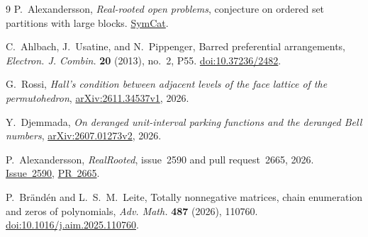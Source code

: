 \documentclass[11pt]{article}
\begin{document}
\begin{thebibliography}{9}
\setlength{\itemsep}{2pt}
P.~Alexandersson, \emph{Real-rooted open problems}, conjecture on ordered set partitions with large blocks.
\href{https://www.symmetricfunctions.com/realRootedOpenProblems.htm\#set-partitions-and-trees}{SymCat}.

C.~Ahlbach, J.~Usatine, and N.~Pippenger, Barred preferential arrangements,
\emph{Electron. J. Combin.} \textbf{20} (2013), no.~2, P55.
\href{https://doi.org/10.37236/2482}{doi:10.37236/2482}.

G.~Rossi, \emph{Hall's condition between adjacent levels of the face lattice of the permutohedron},
\href{https://arxiv.org/abs/2611.34537v1}{arXiv:2611.34537v1}, 2026.

Y.~Djemmada, \emph{On deranged unit-interval parking functions and the deranged Bell numbers},
\href{https://arxiv.org/abs/2607.01273v2}{arXiv:2607.01273v2}, 2026.

P.~Alexandersson, \emph{RealRooted}, issue~2590 and pull request~2665, 2026.
\href{https://github.com/PerAlexandersson/RealRooted/issues/2590}{Issue~2590},
\href{https://github.com/PerAlexandersson/RealRooted/pull/2665}{PR~2665}.

P.~Br\"and\'en and L.~S.~M.~Leite, Totally nonnegative matrices, chain enumeration and zeros of polynomials,
\emph{Adv. Math.} \textbf{487} (2026), 110760.
\href{https://doi.org/10.1016/j.aim.2025.110760}{doi:10.1016/j.aim.2025.110760}.
\end{thebibliography}
\end{document}
